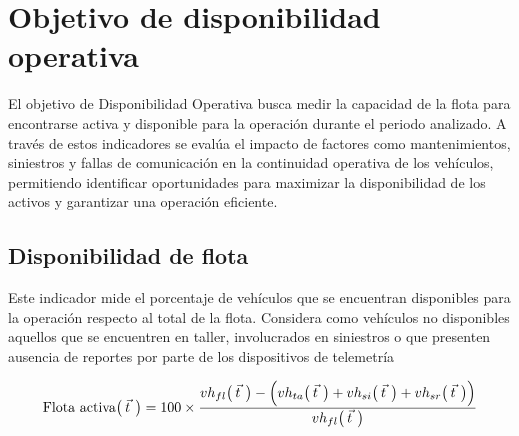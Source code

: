 \section{Objetivo de disponibilidad operativa}

El objetivo de Disponibilidad Operativa busca medir la capacidad de la flota para encontrarse activa y disponible para la operación durante el periodo analizado. A través de estos indicadores se evalúa el impacto de factores como mantenimientos, siniestros y fallas de comunicación en la continuidad operativa de los vehículos, permitiendo identificar oportunidades para maximizar la disponibilidad de los activos y garantizar una operación eficiente.

\subsection{Disponibilidad de flota}

Este indicador mide el porcentaje de vehículos que se encuentran disponibles para la operación respecto al total de la flota. Considera como vehículos no disponibles aquellos que se encuentren en taller, involucrados en siniestros o que presenten ausencia de reportes por parte de los dispositivos de telemetría 

\begin{equation*}
    \text{Flota activa} \big( \hspace{0.07cm} \smash{\vec{t}}\,\vphantom{t} \hspace{0.07cm} \big) = 100 \times \frac{vh_{fl}\big( \hspace{0.07cm} \smash{\vec{t}}\,\vphantom{t} \hspace{0.07cm} \big) - \Big(vh_{ta}\big( \hspace{0.07cm} \smash{\vec{t}}\,\vphantom{t} \hspace{0.07cm} \big) + vh_{si}\big( \hspace{0.07cm} \smash{\vec{t}}\,\vphantom{t} \hspace{0.07cm} \big) + vh_{sr}\big( \hspace{0.07cm} \smash{\vec{t}}\,\vphantom{t} \hspace{0.07cm} \big) \Big) }{vh_{fl} \big( \hspace{0.07cm} \smash{\vec{t}}\,\vphantom{t} \hspace{0.07cm} \big)}
\end{equation*}


